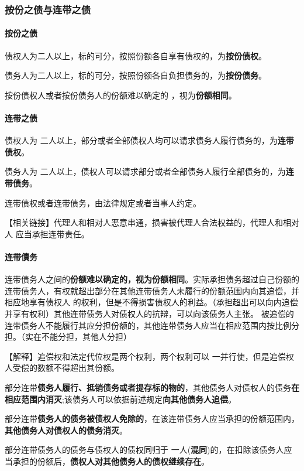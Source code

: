 \documentclass[UTF8,12pt]{ctexart}
\numberwithin{equation}{section} %
\numberwithin{figure}{section}
\numberwithin{table}{section}
\begin{document}
	\subsubsection{按份之债与连带之债}
	\paragraph{按份之债}
	债权人为二人以上，标的可分，按照份额各自享有债权的，为\textbf{按份债权}。
	
	债务人为二人以上，标的可分，按照份额各自负担债务的，为\textbf{按份债务}。 
	
	按份债权人或者按份债务人的份额难以确定的 ，视为\textbf{份额相同}。
	
	\paragraph{连带之债}
	债权人为 二人以上，部分或者全部债权人均可以请求债务人履行债务的，为\textbf{连带债权}。 
	
	债务人为 二人以上，债权人可以请求部分或者全部债务人履行全部债务的，为\textbf{连带债务}。 
	
	连带债权或者连带债务，由法律规定或者当事人约定。 
	
	【相关链接】代理人和相对人恶意串通，损害被代理人合法权益的，代理人和相对人 应当承担连带责任。
	
	\paragraph{连带債务}
	连带债务人之间的\textbf{份额难以确定的，视为份额相同}。实际承担债务超过自己份额的连带债务人，有权就超出部分在其他连带债务人未履行的份额范围内向其追偿，并相应地享有债权人 的权利，但是不得损害债权人的利益。（承担超出可以向内追偿并享有权利）其他连带债务人对债权人的抗辩，可以向该债务人主张。 被追偿的连带债务人不能履行其应分担份额的，其他连带债务人应当在相应范围内按比例分担。（实在不能分担，其他人分担）
	
	【解释】追偿权和法定代位权是两个权利，两个权利可以 一并行使，但是追偿权人受偿的数额不得超出其份额。
	
	部分连带\textbf{债务人履行、抵销债务或者提存标的物的}，其他债务人对债权人的债务\textbf{在相应范围内消灭};该债务人可以依据前述规定\textbf{向其他债务人追偿}。
	
	部分连带\textbf{债务人的债务被债权人免除的}，在该连带债务人应当承担的份额范围内，\textbf{其他债务人对债权人的债务消灭}。
	
	部分连带债务人的债务与债权人的债权同归于 一人(\textbf{混同})的，在扣除该债务人应当承担的份额后，\textbf{债权人对其他债务人的债权继续存在}。
	
\end{document}
